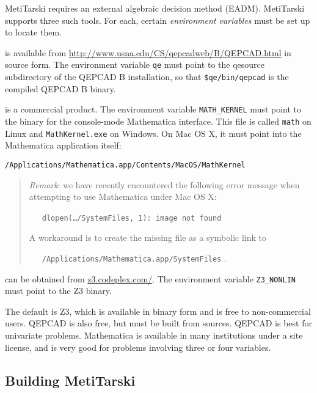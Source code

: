\documentclass[a4paper,11pt]{scrartcl}
\begin{document}
MetiTarski requires an external algebraic decision method (EADM).
MetiTarski supports three such tools. For each, certain \textit{environment variables} must be set up to locate them.


\begin{description}\sloppy
\item[QEPCAD B version 1.69 or later]
is available from \url{http://www.usna.edu/CS/qepcadweb/B/QEPCAD.html} in source form.
The environment variable \texttt{qe} must point to the qesource subdirectory of the QEPCAD B installation, so that \texttt{\$qe/bin/qepcad} is the compiled QEPCAD B binary.


\item[Mathematica version 8.0 or later]
is a commercial product.
The environment variable \verb|MATH_KERNEL| must point to the binary for the console-mode Mathematica interface. This file is called
\texttt{math} on Linux and \texttt{MathKernel.exe} on Windows.
On Mac OS X, it must point into the Mathematica application itself:
\begin{verbatim}
/Applications/Mathematica.app/Contents/MacOS/MathKernel
\end{verbatim}

\begin{quote}
  \textit{Remark}: we have recently encountered the following error message when attempting to use Mathematica under Mac OS X:

\ \ \ \texttt{dlopen(\ldots/SystemFiles, 1): image not found}

A workaround is to create the missing file as a symbolic link to

\ \ \ \texttt{/Applications/Mathematica.app/SystemFiles} .
\end{quote}



\item[Z3 version 4.0 or later]
can be obtained from \url{z3.codeplex.com/}.
The environment variable \verb|Z3_NONLIN| must point to the Z3 binary.
\end{description}


The default is Z3, which is available in binary form and is free to non-commercial users.
QEPCAD is also free, but must be built from sources. QEPCAD is best for univariate
problems. Mathematica is available in many institutions under a site license, and is very good
for problems involving three or four variables.

\subsection{Building MetiTarski}
\end{document}
